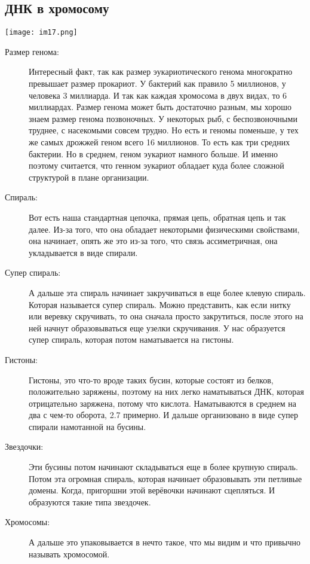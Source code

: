 \subsection{ДНК в хромосому}
\texttt{[image: im17.png]}
\begin{description}
\item[Размер генома:]
Интересный факт, так как размер эукариотического генома многократно 
превышает размер прокариот. У бактерий как правило 5 миллионов, у человека
3 миллиарда. И так как каждая хромосома в двух видах, то 
6 миллиардах. Размер генома может 
быть достаточно разным, мы хорошо знаем размер генома позвоночных. 
У некоторых рыб, с беспозвоночными труднее, с насекомыми совсем трудно. 
Но есть и геномы поменьше, у тех же самых дрожжей геном всего 
16 миллионов. То есть как три средних бактерии. Но в среднем, 
геном эукариот намного больше. И именно поэтому считается, 
что генном эукариот обладает куда более сложной структурой в плане организации. 

\item[Спираль:]
Вот есть наша стандартная цепочка, прямая цепь, обратная цепь и так далее. Из-за
того, что она обладает некоторыми физическими свойствами, она начинает, опять же 
это из-за того, что связь ассиметричная, она укладывается в виде спирали. 

\item[Супер спираль:]
А дальше эта спираль начинает закручиваться в еще более клевую спираль. Которая 
называется супер спираль. Можно представить, как если нитку или веревку скручивать, 
то она сначала просто закрутиться, после этого на ней начнут образовываться 
еще узелки скручивания. У нас образуется супер спираль, 
которая потом наматывается на гистоны. 

\item[Гистоны:]
Гистоны, это что-то вроде таких бусин, 
которые состоят из белков, положительно заряжены, 
поэтому на них легко наматываться ДНК, которая 
отрицательно заряжена, потому что кислота. Наматываются 
в среднем на два с чем-то оборота, 2.7 примерно. И дальше организовано 
в виде супер спирали намотанной на бусины. 

\item[Звездочки:]
Эти бусины потом начинают складываться еще 
в более крупную спираль. Потом эта огромная 
спираль, которая начинает образовывать эти 
петливые домены. Когда, пригоршни этой верёвочки начинают сцепляться. И образуются 
такие типа звездочек. 

\item[Хромосомы:]
А дальше это упаковывается в нечто такое, что мы видим и что привычно называть 
хромосомой. 


\end{description}
